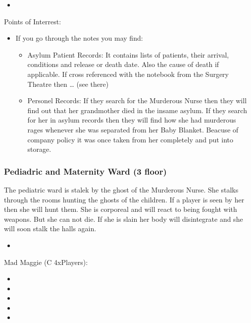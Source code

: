 \documentclass[11pt]{article}
\begin{document}
{\begin{itemize}
\item {}
\end{itemize}

Points of Interrest:
\begin{itemize}
\item If you go through the notes you may find:
\begin{itemize}
\item Asylum Patient Records: It contains lists of patients, their arrival, conditions and release or death date. Also the cause of death if applicable. If cross referenced with the notebook from the Surgery Theatre then \ldots{} (see there)
\item Personel Records: If they search for the Murderous Nurse then they will find out that her grandmother died in the insame asylum. If they search for her in asylum records then they will find how she had murderous rages whenever she was separated from her Baby Blanket. Beacuse of company policy it was once taken from her completely and put into storage.
\end{itemize}
\end{itemize}
\subsubsection{Pediadric and Maternity Ward (3 floor)}
\label{sec:org40425c4}

The pediatric ward is stalek by the ghost of the Murderous Nurse. She stalks through the rooms hunting the ghosts of the children. If a player is seen by her then she will hunt them. She is corporeal and will react to being fought with weapons. But she can not die. If she is slain her body will disintegrate and she will soon stalk the halls again.

\begin{itemize}
\item {}
\end{itemize}

Mad Maggie (C 4xPlayers):
\begin{itemize}
\item {}
\item {}
\item {}
\item {}
\item {}
\end{itemize}
}
\end{document}
